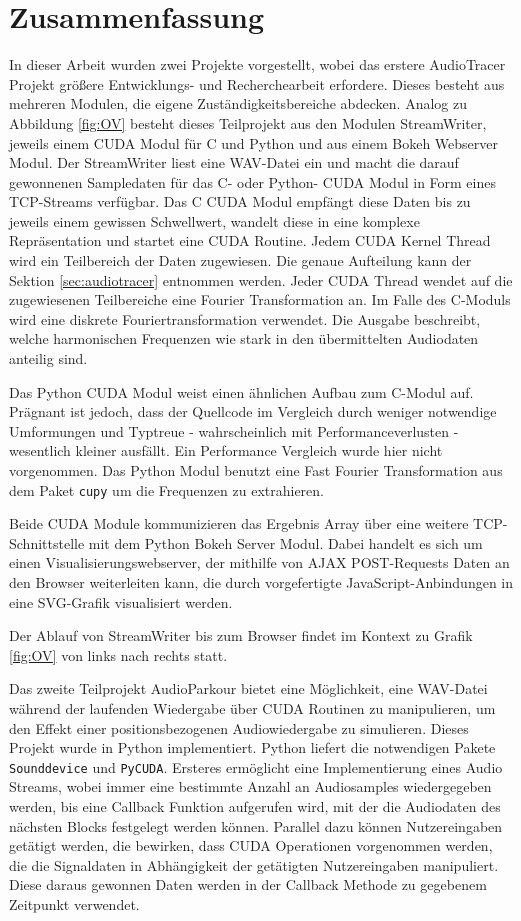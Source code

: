 
\section{Zusammenfassung}

In dieser Arbeit wurden zwei Projekte vorgestellt, wobei das erstere AudioTracer Projekt größere Entwicklungs- und Recherchearbeit erfordere. Dieses besteht aus mehreren Modulen, die eigene Zuständigkeitsbereiche abdecken. Analog zu Abbildung \ref{fig:OV} besteht dieses Teilprojekt aus den Modulen StreamWriter, jeweils einem CUDA Modul für C und Python und aus einem Bokeh Webserver Modul. Der StreamWriter liest eine WAV-Datei ein und macht die darauf gewonnenen Sampledaten für das C- oder Python- CUDA Modul in Form eines TCP-Streams verfügbar. Das C CUDA Modul empfängt diese Daten bis zu jeweils einem gewissen Schwellwert, wandelt diese in eine komplexe Repräsentation und startet eine CUDA Routine. Jedem CUDA Kernel Thread wird ein Teilbereich der Daten zugewiesen. Die genaue Aufteilung kann der Sektion \ref{sec:audiotracer} entnommen werden. Jeder CUDA Thread wendet auf die zugewiesenen Teilbereiche eine Fourier Transformation an. Im Falle des C-Moduls wird eine diskrete Fouriertransformation verwendet. Die Ausgabe beschreibt, welche harmonischen Frequenzen wie stark in den übermittelten Audiodaten anteilig sind.

Das Python CUDA Modul weist einen ähnlichen Aufbau zum C-Modul auf. Prägnant ist jedoch, dass der Quellcode im Vergleich durch weniger notwendige Umformungen und Typtreue - wahrscheinlich mit Performanceverlusten - wesentlich kleiner ausfällt. Ein Performance Vergleich wurde hier nicht vorgenommen. Das Python Modul benutzt eine Fast Fourier Transformation aus dem Paket \texttt{cupy} um die Frequenzen zu extrahieren.

Beide CUDA Module kommunizieren das Ergebnis Array über eine weitere TCP-Schnittstelle mit dem Python Bokeh Server Modul. Dabei handelt es sich um einen Visualisierungswebserver, der mithilfe von AJAX POST-Requests Daten an den Browser weiterleiten kann, die durch vorgefertigte JavaScript-Anbindungen in eine SVG-Grafik visualisiert werden.

Der Ablauf von StreamWriter bis zum Browser findet im Kontext zu Grafik \ref{fig:OV} von links nach rechts statt.

Das zweite Teilprojekt AudioParkour bietet eine Möglichkeit, eine WAV-Datei während der laufenden Wiedergabe über CUDA Routinen zu manipulieren, um den Effekt einer positionsbezogenen Audiowiedergabe zu simulieren. Dieses Projekt wurde in Python implementiert. Python liefert die notwendigen Pakete \texttt{Sounddevice} und \texttt{PyCUDA}. Ersteres ermöglicht eine Implementierung eines Audio Streams, wobei immer eine bestimmte Anzahl an Audiosamples wiedergegeben werden, bis eine Callback Funktion aufgerufen wird, mit der die Audiodaten des nächsten Blocks festgelegt werden können. Parallel dazu können Nutzereingaben getätigt werden, die bewirken, dass CUDA Operationen vorgenommen werden, die die Signaldaten in Abhängigkeit der getätigten Nutzereingaben manipuliert. Diese daraus gewonnen Daten werden in der Callback Methode zu gegebenem Zeitpunkt verwendet. 